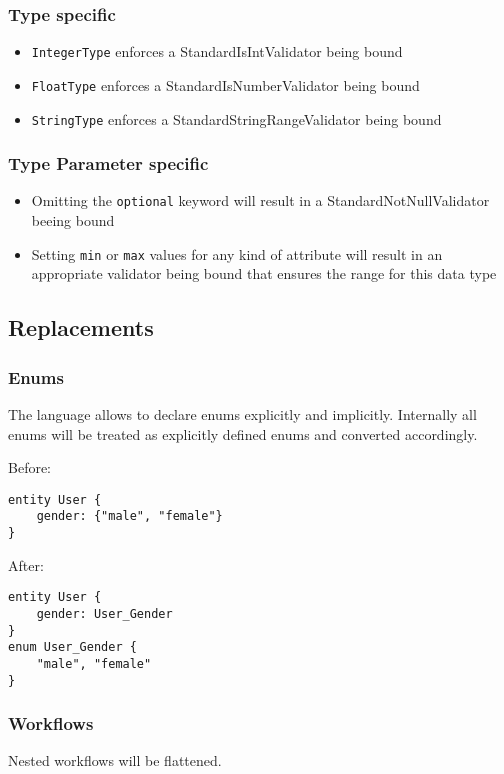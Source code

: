 \subsubsection{Type specific}
\begin{itemize}
\item \lstinline!IntegerType! enforces a StandardIsIntValidator being bound
\item \lstinline!FloatType! enforces a StandardIsNumberValidator being bound
\item \lstinline!StringType! enforces a StandardStringRangeValidator being bound
\end{itemize}

\subsubsection{Type Parameter specific}

\begin{itemize}
\item Omitting the \lstinline!optional! keyword will result in a StandardNotNullValidator beeing bound
\item Setting \lstinline!min! or \lstinline!max! values for any kind of attribute will result in an appropriate validator being bound that ensures the range for this data type
\end{itemize}

\subsection{Replacements}
\subsubsection{Enums}
The \MD language allows to declare enums explicitly and implicitly. Internally all enums will be treated as explicitly defined enums and converted accordingly.

Before:

\begin{lstlisting}[language=MD2]
entity User {
	gender: {"male", "female"}
}
\end{lstlisting}

After:

\begin{lstlisting}[language=MD2]
entity User {
	gender: User_Gender
}
enum User_Gender {
	"male", "female"
}
\end{lstlisting}

\subsubsection{Workflows}
Nested workflows will be flattened.

